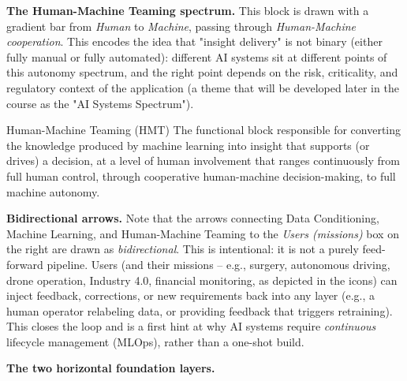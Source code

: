 \textbf{The Human-Machine Teaming spectrum.} This block is drawn with a gradient bar from \emph{Human} to \emph{Machine}, passing through \emph{Human-Machine cooperation}. This encodes the idea that "insight delivery" is not binary (either fully manual or fully automated): different AI systems sit at different points of this autonomy spectrum, and the right point depends on the risk, criticality, and regulatory context of the application (a theme that will be developed later in the course as the "AI Systems Spectrum").

\begin{defbox}{Human-Machine Teaming (HMT)}
The functional block responsible for converting the knowledge produced by machine learning into insight that supports (or drives) a decision, at a level of human involvement that ranges continuously from full human control, through cooperative human-machine decision-making, to full machine autonomy.
\end{defbox}

\textbf{Bidirectional arrows.} Note that the arrows connecting Data Conditioning, Machine Learning, and Human-Machine Teaming to the \emph{Users (missions)} box on the right are drawn as \emph{bidirectional}. This is intentional: it is not a purely feed-forward pipeline. Users (and their missions -- e.g., surgery, autonomous driving, drone operation, Industry 4.0, financial monitoring, as depicted in the icons) can inject feedback, corrections, or new requirements back into any layer (e.g., a human operator relabeling data, or providing feedback that triggers retraining). This closes the loop and is a first hint at why AI systems require \emph{continuous} lifecycle management (MLOps), rather than a one-shot build.

\textbf{The two horizontal foundation layers.}

